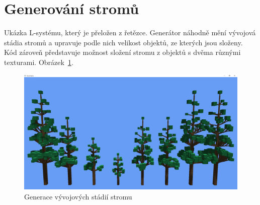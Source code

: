 \documentclass[thesis=M,czech]{FITthesis}[2019/12/23]
\begin{document}
\section{Generování stromů}

Ukázka L-systému, který je přeložen z řetězce. Generátor náhodně mění vý\-vo\-jo\-vá stádia stromů a upravuje podle nich velikost objektů, ze kterých jsou složeny. Kód zároveň představuje možnost složení stromu z objektů s dvěma různými texturami. Obrázek~\ref{fig:ex_trees}.

\begin{figure}\centering
	\includegraphics[width=\textwidth]{images/examples/trees}
	\caption[Generace vývojových stádií stromu]{Generace vývojových stádií stromu}\label{fig:ex_trees}
\end{figure}
\end{document}
